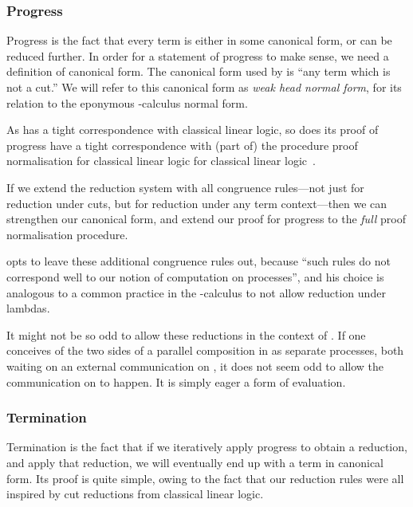 \subsubsection{Progress}
Progress is the fact that every term is either in some canonical form, or can be
reduced further. In order for a statement of progress to make sense, we need a
definition of canonical form. The canonical form used by \cp is ``any term which
is not a cut.'' We will refer to this canonical form as \emph{weak head normal
form}, for its relation to the eponymous \textlambda-calculus normal form. 

As \cp has a tight correspondence with classical linear logic, so does its proof
of progress have a tight correspondence with (part of) the procedure proof
normalisation for classical linear logic for classical linear
logic~\cite{girard1987}.

If we extend the reduction system with all congruence rules---not just
\cpRedGammaCut for reduction under cuts, but for reduction under any term
context---then we can strengthen our canonical form, and extend our proof for
progress to the \emph{full} proof normalisation procedure.


 opts to leave these additional congruence rules out,
because ``such rules do not correspond well to our notion of computation on
processes'', and his choice is analogous to a common practice in the
\textlambda-calculus to not allow reduction under lambdas.

It might not be so odd to allow these reductions in the context of \cp.
If one conceives of the two sides of a parallel composition in
 as separate processes, both waiting on an
external communication on , it does not seem odd to allow the
communication on  to happen. It is simply eager a form of evaluation.

\subsubsection{Termination}
\label{sec:cp-termination}
Termination is the fact that if we iteratively apply progress to obtain a
reduction, and apply that reduction, we will eventually end up with a term in
canonical form.
Its proof is quite simple, owing to the fact that our reduction rules were all
inspired by cut reductions from classical linear logic.


